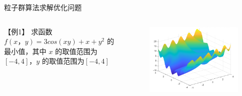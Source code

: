 \documentclass[xcolor=table,dvipsnames,svgnames,aspectratio=169,fontset=ubuntu]{ctexbeamer}
\begin{document}
\begin{frame}{粒子群算法求解优化问题}
  \begin{columns}
    【例1】
    \vskip 10pt
    求函数 \(f(x，y) = 3cos(xy) + x + y^2\) 的最小值，其中 \(x\) 的取值范围为\([-4,4]\)，\(y\) 的取值范围为\([-4,4]\)
  

    \begin{figure}
      \centering
      \includegraphics[width=\textwidth]{例1.png}
    \end{figure}
  \end{columns}
\end{frame}
\end{document}
